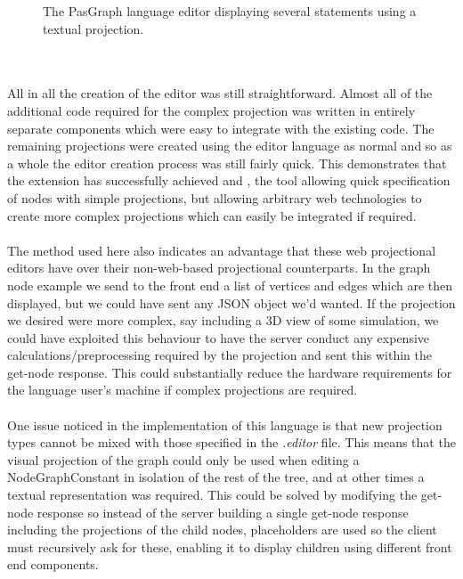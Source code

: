 \documentclass{article}
\begin{document}
{\begin{figure}[h!]
  \caption{The PasGraph language editor displaying several statements using a textual projection.}
  \label{fig:pasgraphUI1}
\end{figure}
\\
\\
All in all the creation of the editor was still straightforward. Almost all of the additional code required for the complex projection was written in entirely separate components which were easy to integrate with the existing code. The remaining projections were created using the editor language as normal and so as a whole the editor creation process was still fairly quick. This demonstrates that the extension has successfully achieved \RSetup and \RCustom, the tool allowing quick specification of nodes with simple projections, but allowing arbitrary web technologies to create more complex projections which can easily be integrated if required. 
\\
\\
The method used here also indicates an advantage that these web projectional editors have over their non-web-based projectional counterparts. In the graph node example we send to the front end a list of vertices and edges which are then displayed, but we could have sent any JSON object we'd wanted. If the projection we desired were more complex, say including a 3D view of some simulation, we could have exploited this behaviour to have the server conduct any expensive calculations/preprocessing required by the projection and sent this within the get-node response. This could substantially reduce the hardware requirements for the language user's machine if complex projections are required.
\\
\\
One issue noticed in the implementation of this language is that new projection types cannot be mixed with those specified in the \emph{.editor} file. This means that the visual projection of the graph could only be used when editing a NodeGraphConstant in isolation of the rest of the tree, and at other times a textual representation was required. This could be solved by modifying the get-node response so instead of the server building a single get-node response including the projections of the child nodes, placeholders are used so the client must recursively ask for these, enabling it to display children using different front end components.
%
%
}
\end{document}
